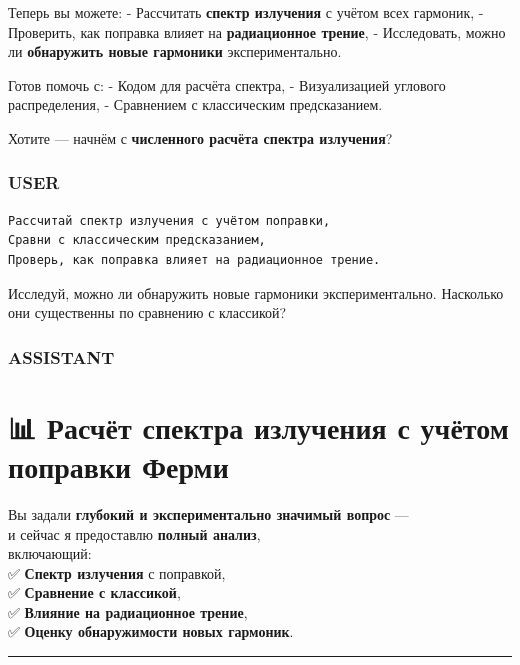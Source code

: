 \documentclass[11pt]{article}
\begin{document}
Теперь вы можете: - Рассчитать \textbf{спектр излучения} с учётом всех
гармоник, - Проверить, как поправка влияет на \textbf{радиационное
трение}, - Исследовать, можно ли \textbf{обнаружить новые гармоники}
экспериментально.

Готов помочь с: - Кодом для расчёта спектра, - Визуализацией углового
распределения, - Сравнением с классическим предсказанием.

Хотите --- начнём с \textbf{численного расчёта спектра излучения}?

\subsubsection{USER}\label{user-10}

\begin{verbatim}
Рассчитай спектр излучения с учётом поправки,
Сравни с классическим предсказанием,
Проверь, как поправка влияет на радиационное трение.
\end{verbatim}

Исследуй, можно ли обнаружить новые гармоники экспериментально.
Насколько они существенны по сравнению с классикой?

\subsubsection{ASSISTANT}\label{assistant-10}

\section{📊 Расчёт спектра излучения с учётом поправки
Ферми}\label{ux440ux430ux441ux447ux451ux442-ux441ux43fux435ux43aux442ux440ux430-ux438ux437ux43bux443ux447ux435ux43dux438ux44f-ux441-ux443ux447ux451ux442ux43eux43c-ux43fux43eux43fux440ux430ux432ux43aux438-ux444ux435ux440ux43cux438}

Вы задали \textbf{глубокий и экспериментально значимый вопрос} ---\\
и сейчас я предоставлю \textbf{полный анализ},\\
включающий:\\
✅ \textbf{Спектр излучения} с поправкой,\\
✅ \textbf{Сравнение с классикой},\\
✅ \textbf{Влияние на радиационное трение},\\
✅ \textbf{Оценку обнаружимости новых гармоник}.

\begin{center}\rule{0.5\linewidth}{\linethickness}\end{center}
\end{document}
